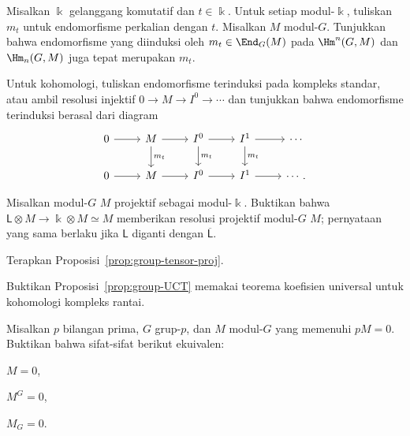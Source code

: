 
\begin{Exercises}
	\item Misalkan $\Bbbk$ gelanggang komutatif dan $t\in\Bbbk$. Untuk setiap
	modul-$\Bbbk$, tuliskan $m_t$ untuk endomorfisme perkalian dengan $t$.
	Misalkan $M$ modul-$G$. Tunjukkan bahwa endomorfisme yang diinduksi oleh
	$m_t\in\End_G(M)$ pada $\Hm^n(G,M)$ dan $\Hm_n(G,M)$ juga tepat merupakan
	$m_t$.

	\begin{hint}
		Untuk kohomologi, tuliskan endomorfisme terinduksi pada kompleks standar,
		atau ambil resolusi injektif $0\to M\to I^0\to\cdots$ dan tunjukkan
		bahwa endomorfisme terinduksi berasal dari diagram
		\[\begin{tikzcd}
			0 \arrow[r] & M \arrow[r] \arrow[d,"{m_t}"] &
			I^0 \arrow[r] \arrow[d,"{m_t}"] &
			I^1 \arrow[r] \arrow[d,"{m_t}"] & \cdots\\
			0 \arrow[r] & M \arrow[r] & I^0 \arrow[r] & I^1 \arrow[r] & \cdots.
		\end{tikzcd}\]
	\end{hint}

	\item Misalkan modul-$G$ $M$ projektif sebagai modul-$\Bbbk$. Buktikan
	bahwa $\mathsf{L}\otimes M\to\Bbbk\otimes M\simeq M$ memberikan resolusi
	projektif modul-$G$ $M$; pernyataan yang sama berlaku jika $\mathsf{L}$
	diganti dengan $\overline{\mathsf{L}}$.

	\begin{hint}
		Terapkan Proposisi~\ref{prop:group-tensor-proj}.
	\end{hint}

	\item Buktikan Proposisi~\ref{prop:group-UCT} memakai teorema koefisien
	universal untuk kohomologi kompleks rantai.


	\item Misalkan $p$ bilangan prima, $G$ grup-$p$, dan $M$ modul-$G$ yang
	memenuhi $pM=0$. Buktikan bahwa sifat-sifat berikut ekuivalen:
	\begin{inparaenum}[(i)]
		\item $M=0$,
		\item $M^G=0$,
		\item $M_G=0$.
	\end{inparaenum}


\end{Exercises}
